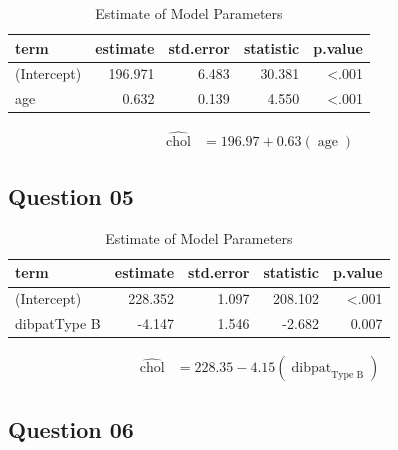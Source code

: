 \documentclass[
  12pt,
  oneside]{article}
\begin{document}
\begin{table}[H]

\caption{\label{tab:Table-05}Estimate of Model Parameters}
\centering
\begin{tabular}[t]{lrrrr}
\toprule
term & estimate & std.error & statistic & p.value\\
\midrule
(Intercept) & 196.971 & 6.483 & 30.381 & <.001\\
age & 0.632 & 0.139 & 4.550 & <.001\\
\bottomrule
\end{tabular}
\end{table}

\begin{equation}
\begin{aligned}
\operatorname{\widehat{chol}} &= 196.97 + 0.63(\operatorname{age})
\end{aligned}
\end{equation}

\hypertarget{question-05}{%
\subsection{Question 05}\label{question-05}}

\begin{table}[H]

\caption{\label{tab:Table-06}Estimate of Model Parameters}
\centering
\begin{tabular}[t]{lrrrr}
\toprule
term & estimate & std.error & statistic & p.value\\
\midrule
(Intercept) & 228.352 & 1.097 & 208.102 & <.001\\
dibpatType B & -4.147 & 1.546 & -2.682 & 0.007\\
\bottomrule
\end{tabular}
\end{table}

\begin{equation}
\begin{aligned}
\operatorname{\widehat{chol}} &= 228.35 - 4.15(\operatorname{dibpat}_{\operatorname{Type\ B}})
\end{aligned}
\end{equation}

\hypertarget{question-06}{%
\subsection{Question 06}\label{question-06}}
\end{document}
